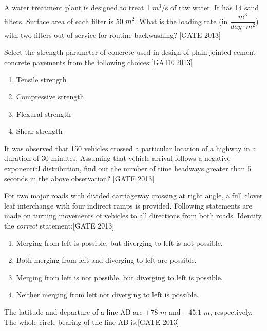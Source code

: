     \item A water treatment plant is designed to treat 1 $m^3$/s of raw water. It has 14 sand filters. Surface area of each filter is 50 $m^2$. What is the loading rate (in $\dfrac{m^3}{day \cdot m^2}$) with two filters out of service for routine backwashing? \underline{\hspace{2cm}}\hfill{[GATE 2013]}
\\
    \item Select the strength parameter of concrete used in design of plain jointed cement concrete pavements from the following choices:\hfill{[GATE 2013]}

    \begin{multicols}{2}
    \begin{enumerate}
        \item Tensile strength
        \item Compressive strength
        \item Flexural strength
        \item Shear strength
    \end{enumerate}
    \end{multicols}

    \item It was observed that 150 vehicles crossed a particular location of a highway in a duration of 30 minutes. Assuming that vehicle arrival follows a negative exponential distribution, find out the number of time headways greater than 5 seconds in the above observation? \underline{\hspace{2cm}}\hfill{[GATE 2013]}\\

    \item For two major roads with divided carriageway crossing at right angle, a full clover leaf interchange with four indirect ramps is provided. Following statements are made on turning movements of vehicles to all directions from both roads. Identify the \textit{correct} statement:\hfill{[GATE 2013]}
    
   
    \begin{enumerate}
        \item Merging from left is possible, but diverging to left is not possible.
        \item Both merging from left and diverging to left are possible.
        \item Merging from left is not possible, but diverging to left is possible.
        \item Neither merging from left nor diverging to left is possible.\\
    \end{enumerate} 
    \item The latitude and departure of a line AB are $+78$  $m$ and $-45.1$  $m$, respectively. The whole circle bearing of the line AB is:\hfill{[GATE 2013]}
    
